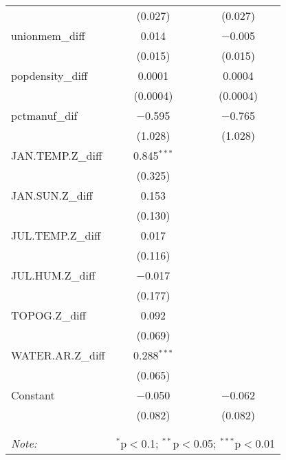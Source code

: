\begin{table}[!htbp]
\begin{tabular}{@{\extracolsep{5pt}}lcc}
  & (0.027) & (0.027) \\ 
  unionmem\_diff & 0.014 & $-$0.005 \\ 
  & (0.015) & (0.015) \\ 
  popdensity\_diff & 0.0001 & 0.0004 \\ 
  & (0.0004) & (0.0004) \\ 
  pctmanuf\_dif & $-$0.595 & $-$0.765 \\ 
  & (1.028) & (1.028) \\ 
  JAN.TEMP.Z\_diff & 0.845$^{***}$ &  \\ 
  & (0.325) &  \\ 
  JAN.SUN.Z\_diff & 0.153 &  \\ 
  & (0.130) &  \\ 
  JUL.TEMP.Z\_diff & 0.017 &  \\ 
  & (0.116) &  \\ 
  JUL.HUM.Z\_diff & $-$0.017 &  \\ 
  & (0.177) &  \\ 
  TOPOG.Z\_diff & 0.092 &  \\ 
  & (0.069) &  \\ 
  WATER.AR.Z\_diff & 0.288$^{***}$ &  \\ 
  & (0.065) &  \\ 
  Constant & $-$0.050 & $-$0.062 \\ 
  & (0.082) & (0.082) \\ 
 \hline \\[-1.8ex] 
\hline 
\hline \\[-1.8ex] 
\textit{Note:}  & \multicolumn{2}{r}{$^{*}$p$<$0.1; $^{**}$p$<$0.05; $^{***}$p$<$0.01} \\ 
\end{tabular} 
\end{table} 
